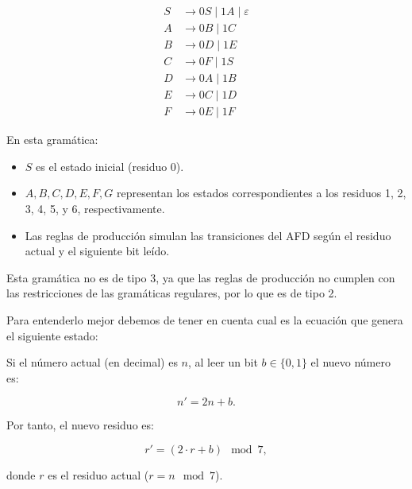 \documentclass[12pt]{book} %
\begin{document}
\begin{ejercicio}
\begin{itemize}
\begin{itemize}
\begin{solucion}[difícil.b]
        \begin{align*}
        S &\rightarrow 0S \mid 1A \mid \varepsilon \\
        A &\rightarrow 0B \mid 1C \\
        B &\rightarrow 0D \mid 1E \\
        C &\rightarrow 0F \mid 1S \\
        D &\rightarrow 0A \mid 1B \\
        E &\rightarrow 0C \mid 1D \\
        F &\rightarrow 0E \mid 1F
        \end{align*}

        En esta gramática: 
        
        \begin{itemize}
            \item $S$ es el estado inicial (residuo 0).
            \item $A, B, C, D, E, F, G$ representan los estados correspondientes a los residuos 1, 2, 3, 4, 5, y 6, respectivamente.
            \item Las reglas de producción simulan las transiciones del AFD según el residuo actual y el siguiente bit leído.
        \end{itemize}

        Esta gramática no es de tipo 3, ya que las reglas de producción no cumplen con las restricciones de las gramáticas regulares, por lo que es de tipo 2.

        Para entenderlo mejor debemos de tener en cuenta cual es la ecuación que genera el siguiente estado:


        Si el número actual (en decimal) es $n$, al leer un bit $b \in \{0, 1\}$ el nuevo número es:

        $$
        n' = 2n + b.
        $$

        Por tanto, el nuevo residuo es:

        $$
        r' = (2 \cdot r + b) \mod 7,
        $$

        donde $r$ es el residuo actual ($r = n \mod 7$).



\end{solucion}
\end{itemize}
\end{itemize}
\end{ejercicio}
\end{document}
